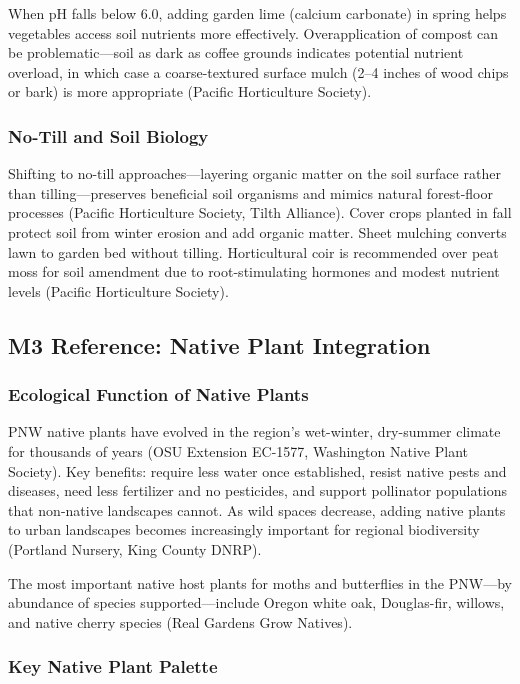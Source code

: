 \documentclass[11pt,letterpaper]{article}
\begin{document}
When pH falls below 6.0, adding garden lime (calcium carbonate) in spring helps vegetables access soil nutrients more effectively. Overapplication of compost can be problematic---soil as dark as coffee grounds indicates potential nutrient overload, in which case a coarse-textured surface mulch (2--4 inches of wood chips or bark) is more appropriate (Pacific Horticulture Society).

\subsubsection{No-Till and Soil Biology}

Shifting to no-till approaches---layering organic matter on the soil surface rather than tilling---preserves beneficial soil organisms and mimics natural forest-floor processes (Pacific Horticulture Society, Tilth Alliance). Cover crops planted in fall protect soil from winter erosion and add organic matter. Sheet mulching converts lawn to garden bed without tilling. Horticultural coir is recommended over peat moss for soil amendment due to root-stimulating hormones and modest nutrient levels (Pacific Horticulture Society).

\subsection{M3 Reference: Native Plant Integration}

\subsubsection{Ecological Function of Native Plants}

PNW native plants have evolved in the region's wet-winter, dry-summer climate for thousands of years (OSU Extension EC-1577, Washington Native Plant Society). Key benefits: require less water once established, resist native pests and diseases, need less fertilizer and no pesticides, and support pollinator populations that non-native landscapes cannot. As wild spaces decrease, adding native plants to urban landscapes becomes increasingly important for regional biodiversity (Portland Nursery, King County DNRP).

The most important native host plants for moths and butterflies in the PNW---by abundance of species supported---include Oregon white oak, Douglas-fir, willows, and native cherry species (Real Gardens Grow Natives).

\subsubsection{Key Native Plant Palette}
\end{document}
